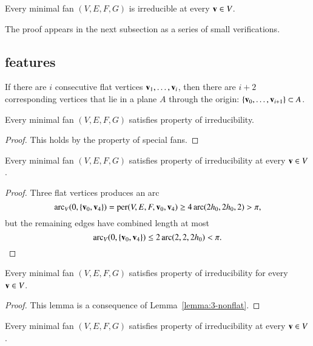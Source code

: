 \begin{lemma}\label{lemma:min-irred}
Every minimal fan $(V,E,F,G)$ is irreducible at every ${\mathbf v}\in V$.
\end{lemma}

The proof appears in the next subsection as a series of small verifications.

\subsection{features}

 If there are $i$ consecutive flat vertices ${\mathbf v}_1,\ldots,{\mathbf v}_i$, then there are  $i+2$ corresponding vertices that lie in a plane $A$ through the origin: $\{{\mathbf v}_0,\ldots,{\mathbf v}_{i+1}\}\subset A$.

\begin{lemma}
Every minimal fan $(V,E,F,G)$ satisfies property  of irreducibility.
\end{lemma}

\begin{proof} This holds by the property  of special fans.
\end{proof}


\begin{lemma}
Every minimal fan $(V,E,F,G)$ satisfies property  of irreducibility at every ${\mathbf v}\in V$.  
\end{lemma}

\begin{proof}  Three flat vertices produces an arc
$$
\operatorname{arc}_V(0,\{{\mathbf v}_0,{\mathbf v}_4\}) = {\operatorname{per}}(V,E,F,{\mathbf v}_0,{\mathbf v}_4) \ge4\operatorname{arc}(2{h_0},2{h_0},2) > \pi,
$$
but the remaining edges  have combined length at most
$$
\operatorname{arc}_V(0,\{{\mathbf v}_0,{\mathbf v}_4\})\le 2\operatorname{arc}(2,2,2{h_0}) < \pi.
$$
\end{proof}

\begin{lemma}
Every minimal fan $(V,E,F,G)$ satisfies property  of irreducibility for every ${\mathbf v}\in V$.
\end{lemma}

\begin{proof}  
This lemma is a consequence of Lemma~\ref{lemma:3-nonflat}.
\end{proof}



\begin{lemma}
Every minimal fan $(V,E,F,G)$ satisfies property  of irreducibility at every ${\mathbf v}\in V$.
\end{lemma}

